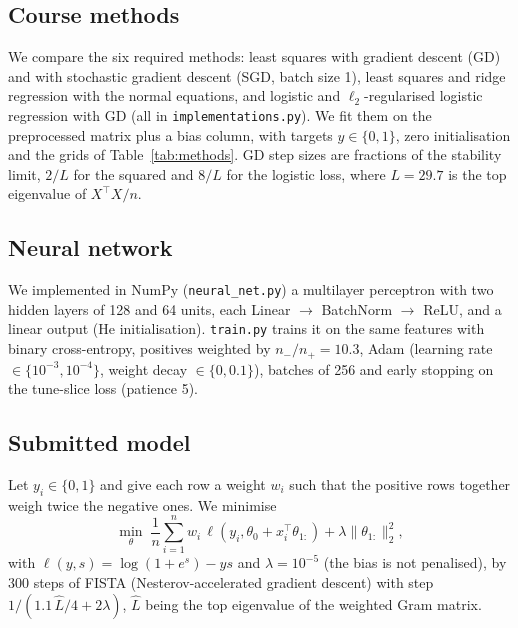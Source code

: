 \documentclass[10pt,conference,compsocconf]{IEEEtran}
\begin{document}
\subsection{Course methods}
We compare the six required methods: least squares with gradient descent (GD)
and with stochastic gradient descent (SGD, batch size 1), least squares and
ridge regression with the normal equations, and logistic and
$\ell_2$-regularised logistic regression with GD (all in
\texttt{implementations.py}).
We fit them on the preprocessed matrix plus a bias column, with targets
$y\in\{0,1\}$, zero initialisation and the grids of Table~\ref{tab:methods}.
GD step sizes are fractions of the stability limit, $2/L$ for the squared and
$8/L$ for the logistic loss, where $L=29.7$ is the top eigenvalue of $X^{\top}X/n$.

\subsection{Neural network}
We implemented in NumPy (\texttt{neural\_net.py}) a multilayer perceptron with two
hidden layers of 128 and 64 units, each Linear $\to$ BatchNorm $\to$ ReLU, and a
linear output (He initialisation). \texttt{train.py} trains it on the same
features with binary cross-entropy, positives weighted by
$n_{-}/n_{+}=10.3$, Adam (learning rate $\in\{10^{-3},10^{-4}\}$, weight decay
$\in\{0,0.1\}$), batches of 256 and early stopping on the tune-slice loss
(patience 5).

\subsection{Submitted model}
Let $y_i\in\{0,1\}$ and give each row a weight $w_i$ such that the positive rows
together weigh twice the negative ones. We minimise
\begin{equation}
\min_{\theta}\;\frac{1}{n}\sum_{i=1}^{n} w_i\,
\ell\!\left(y_i,\theta_0+x_i^{\top}\theta_{1:}\right)
+\lambda\|\theta_{1:}\|_2^2 ,
\label{eq:obj}
\end{equation}
with $\ell(y,s)=\log(1+e^{s})-ys$ and $\lambda=10^{-5}$ (the bias is not
penalised), by 300 steps of FISTA (Nesterov-accelerated gradient descent) with step
$1/(1.1\,\hat L/4+2\lambda)$, $\hat L$ being the top eigenvalue of the weighted Gram matrix.
\end{document}
